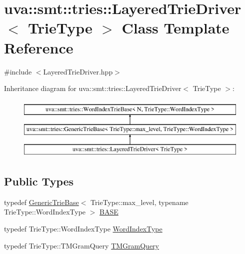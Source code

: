 \hypertarget{classuva_1_1smt_1_1tries_1_1_layered_trie_driver}{}\section{uva\+:\+:smt\+:\+:tries\+:\+:Layered\+Trie\+Driver$<$ Trie\+Type $>$ Class Template Reference}
\label{classuva_1_1smt_1_1tries_1_1_layered_trie_driver}


{\ttfamily \#include $<$Layered\+Trie\+Driver.\+hpp$>$}

Inheritance diagram for uva\+:\+:smt\+:\+:tries\+:\+:Layered\+Trie\+Driver$<$ Trie\+Type $>$\+:\begin{figure}[H]
\begin{center}
\leavevmode
\includegraphics[height=3.000000cm]{classuva_1_1smt_1_1tries_1_1_layered_trie_driver}
\end{center}
\end{figure}
\subsection*{Public Types}
\begin{DoxyCompactItemize}
\item 
typedef \hyperlink{classuva_1_1smt_1_1tries_1_1_generic_trie_base}{Generic\+Trie\+Base}$<$ Trie\+Type\+::max\+\_\+level, typename Trie\+Type\+::\+Word\+Index\+Type $>$ \hyperlink{classuva_1_1smt_1_1tries_1_1_layered_trie_driver_a039f866f4bab8e7313cfc9fa2cb51f5b}{B\+A\+S\+E}
\item 
typedef Trie\+Type\+::\+Word\+Index\+Type \hyperlink{classuva_1_1smt_1_1tries_1_1_layered_trie_driver_aaa30a8f51f4e610158fa8cf0eb965c01}{Word\+Index\+Type}
\item 
typedef Trie\+Type\+::\+T\+M\+Gram\+Query \hyperlink{classuva_1_1smt_1_1tries_1_1_layered_trie_driver_a260d262d60ecb64e33f39609e4dcfae9}{T\+M\+Gram\+Query}
\end{DoxyCompactItemize}
